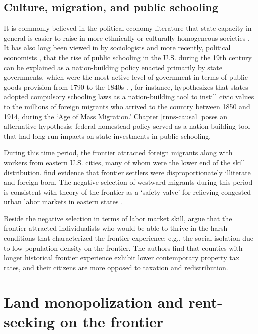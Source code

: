 \subsection{Culture, migration, and public schooling}

It is commonly believed in the political economy literature that state capacity in general is easier to raise in more ethnically or culturally homogeneous societies \citep{besley2010state}. It has also long been viewed in by sociologists \citep{meyer1979public} and more recently, political economists \citep{alesina2013nation,bandiera2018nation}, that the rise of public schooling in the U.S. during the 19th century can be explained as a nation-building policy enacted primarily by state governments, which were the most active level of government in terms of public goods provision from 1790 to the 1840s \citep{wallis2000american}. \citet{bandiera2018nation}, for instance, hypothesizes that states adopted compulsory schooling laws as a nation-building tool to instill civic values to the millions of foreign migrants who arrived to the country between 1850 and 1914, during the `Age of Mass Migration.' Chapter \ref{rnns-causal} poses an alternative hypothesis: federal homestead policy served as a nation-building tool that had long-run impacts on state investments in public schooling. 

During this time period, the frontier attracted foreign migrants along with workers from eastern U.S. cities, many of whom were the lower end of the skill distribution. \citet{bazzi2017frontier} find evidence that frontier settlers were disproportionately illiterate and foreign-born. The negative selection of westward migrants during this period is consistent with theory of the frontier as a `safety valve' for relieving congested urban labor markets in eastern states \citep{turner1956significance, ferrie1997migration}.

Beside the negative selection in terms of labor market skill, \citet{bazzi2017frontier} argue that the frontier attracted individualists who would be able to thrive in the harsh conditions that characterized the frontier experience; e.g., the social isolation due to low population density on the frontier. The authors find that counties with longer historical frontier experience exhibit lower contemporary property tax rates, and their citizens are more opposed to taxation and redistribution. 

\section{Land monopolization and rent-seeking on the frontier} 

